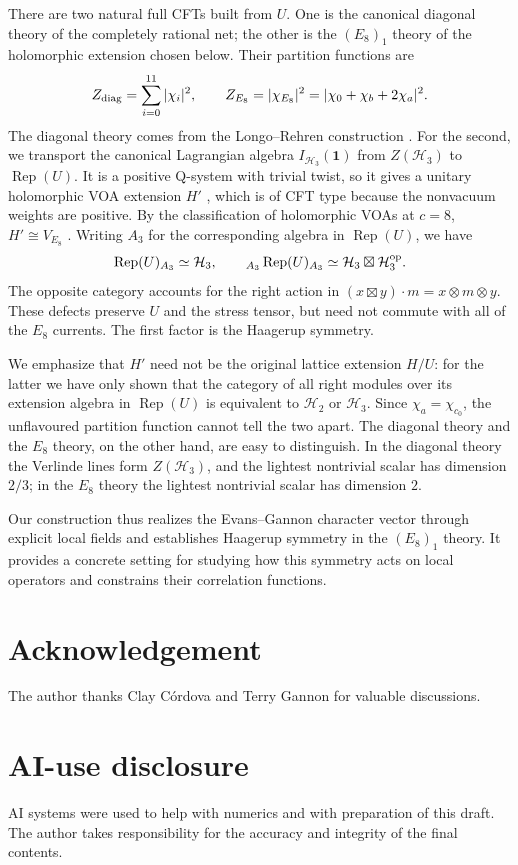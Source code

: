 \documentclass[11pt,a4paper]{article}
\DeclareMathOperator{\Rep}{Rep}
\newcommand{\HH}{\mathcal H}
\newcommand{\one}{\mathbf1}
\begin{document}
There are two natural full CFTs built from $U$. One is the canonical
diagonal theory of the completely rational net; the other is the
$(E_8)_1$ theory of the holomorphic extension chosen below. Their
partition functions are
\begin{equation}\label{eq:partitions}
 Z_{\rm diag}=\sum_{i=0}^{11}|\chi_i|^2,\qquad
 Z_{E_8}=|\chi_{E_8}|^2
       =|\chi_0+\chi_b+2\chi_a|^2.
\end{equation}
The diagonal theory comes from the Longo--Rehren construction
\cite{Rehren}. For the second, we transport the canonical Lagrangian
algebra $I_{\HH_3}(\one)$ from $Z(\HH_3)$ to $\Rep(U)$. It is a
positive Q-system with trivial twist, so it gives a unitary holomorphic
VOA extension $H'$ \cite{HKL,Gui}, which is of CFT type because the
nonvacuum weights are positive. By the classification of holomorphic
VOAs at $c=8$, $H'\cong V_{E_8}$ \cite{DM}. Writing $A_3$ for the
corresponding algebra in $\Rep(U)$, we have
\begin{equation}\label{eq:defects}
 \Rep(U)_{A_3}\simeq\HH_3,\qquad
 {}_{A_3}\Rep(U)_{A_3}\simeq\HH_3\boxtimes\HH_3^{\rm op}.
\end{equation}
The opposite category accounts for the right action in
$(x\boxtimes y)\cdot m=x\otimes m\otimes y$. These defects preserve
$U$ and the stress tensor, but need not commute with all of the $E_8$
currents. The first factor is the Haagerup symmetry.

We emphasize that $H'$ need not be the original lattice extension
$H/U$: for the latter we have only shown that the category of all right
modules over its extension algebra in $\Rep(U)$ is equivalent to
$\HH_2$ or $\HH_3$. Since $\chi_a=\chi_{c_0}$, the unflavoured
partition function cannot tell the two apart. The diagonal theory and
the $E_8$ theory, on the other hand, are easy to distinguish. In the
diagonal theory the Verlinde lines form $Z(\HH_3)$, and the lightest
nontrivial scalar has dimension $2/3$; in the $E_8$ theory the lightest
nontrivial scalar has dimension $2$.

Our construction thus realizes the Evans--Gannon character vector
through explicit local fields and establishes Haagerup symmetry
in the $(E_8)_1$ theory. It provides a concrete setting for studying
how this symmetry acts on local operators and constrains their
correlation functions.

\section*{Acknowledgement}
  The author thanks Clay Córdova and Terry Gannon for valuable discussions.
\section*{AI-use disclosure}
AI systems were used to help with numerics and with preparation of this draft. The author takes responsibility
for the accuracy and integrity of the final contents.

\end{document}
